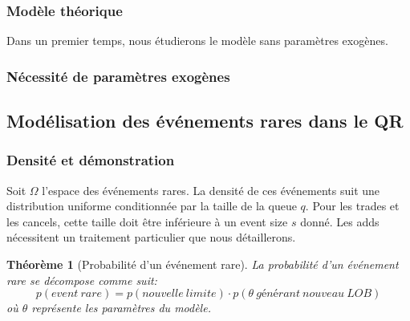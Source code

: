 \documentclass[12pt,a4paper]{article}
\newtheorem{theorem}{Théorème}[section]
\theoremstyle{definition}
\theoremstyle{remark}
\begin{document}
\subsubsection{Modèle théorique}
Dans un premier temps, nous étudierons le modèle sans paramètres exogènes.
\subsubsection{Nécessité de paramètres exogènes}
\subsection{Modélisation des événements rares dans le QR}
\subsubsection{Densité et démonstration}

Soit $\Omega$ l'espace des événements rares. La densité de ces événements suit une distribution uniforme conditionnée par la taille de la queue $q$. Pour les trades et les cancels, cette taille doit être inférieure à un event size $s$ donné. Les adds nécessitent un traitement particulier que nous détaillerons.

\begin{theorem}[Probabilité d'un événement rare]
La probabilité d'un événement rare se décompose comme suit:
\begin{equation}
    p(event\ rare) = p(nouvelle\ limite) \cdot p(\theta\ générant\ nouveau\ LOB)
\end{equation}
où $\theta$ représente les paramètres du modèle.
\end{theorem}
\end{document}
